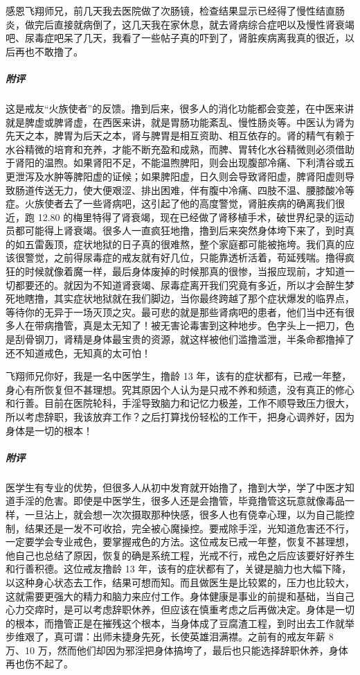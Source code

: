 \begin{case}
    感恩飞翔师兄，前几天我去医院做了次肠镜，检查结果显示已经得了慢性结直肠炎，做完后直接就病倒了，这几天我在家休息，就去肾病综合症吧以及慢性肾衰竭吧、尿毒症吧呆了几天，我看了一些帖子真的吓到了，肾脏疾病离我真的很近，以后再也不敢撸了。
    \subparagraph{附评} 这是戒友“火族使者”的反馈。撸到后来，很多人的消化功能都会变差，在中医来讲就是脾虚或脾肾虚，在西医来讲，就是胃肠功能紊乱、慢性肠炎等。中医认为肾为先天之本，脾胃为后天之本，肾与脾胃是相互资助、相互依存的。肾的精气有赖于水谷精微的培育和充养，才能不断充盈和成熟，而脾、胃转化水谷精微则必须借助于肾阳的温煦。如果肾阳不足，不能温煦脾阳，则会出现腹部冷痛、下利清谷或五更泄泻及水肿等脾阳虚的证候；如果脾阳虚，日久则会导致肾阳虚，脾肾阳虚则导致肠道传送无力，使大便艰涩、排出困难，伴有腹中冷痛、四肢不温、腰膝酸冷等症。火族使者去了一些肾病吧，这引起了他的高度警觉，肾脏疾病的确离我们很近，跑 12.80 的梅里特得了肾衰竭，现在已经做了肾移植手术，破世界纪录的运动员都可能得上肾衰竭。很多人一直疯狂地撸，撸到后来突然身体垮下来了，到时真的如五雷轰顶，症状地狱的日子真的很难熬，整个家庭都可能被拖垮。我们真的应该很警觉，之前得尿毒症的戒友就有好几位，只能靠透析活着，苟延残喘。撸得疯狂的时候就像着魔一样，最后身体废掉的时候那真的很惨，当报应现前，才知道一切都要还的。就因为不知道肾衰竭、尿毒症离开我们究竟有多近，所以才会醉生梦死地瞎撸，其实症状地狱就在我们脚边，当你最终跨越了那个症状爆发的临界点，等待你的无异于一场灭顶之灾。最可悲的就是那些肾病吧的患者，他们当中还有很多人在带病撸管，真是太无知了！被无害论毒害到这种地步。色字头上一把刀，色是刮骨钢刀，肾精是身体最宝贵的资源，就这样被他们滥撸滥泄，半条命都撸掉了还不知道戒色，无知真的太可怕！
\end{case}

\begin{case}
    飞翔师兄你好，我是一名中医学生，撸龄 13 年，该有的症状都有，已戒一年整，身心有所恢复但不甚理想。究其原因个人认为是只戒不养和频遗，没有真正的修心和行善。目前在医院轮科，手淫导致脑力和记忆力极差，工作不顺导致压力很大，所以考虑辞职，我该放弃工作？之后打算找份轻松的工作干，把身心调养好，因为身体是一切的根本！
    \subparagraph{附评} 医学生有专业的优势，但很多人从初中发育就开始撸了，撸到大学，学了中医才知道手淫的危害。即使是中医学生，很多人还是会撸管，毕竟撸管这玩意就像毒品一样，一旦沾上，就会想一次次摄取那种快感，很多人也有侥幸心理，以为自己能控制，结果还是一发不可收拾，完全被心魔操控。要戒除手淫，光知道危害还不行，一定要学会专业戒色，要掌握戒色的方法。这位戒友已戒一年整，恢复不甚理想，他自己也总结了原因，恢复的确是系统工程，光戒不行，戒色之后应该要好好养生和行善积德。这位戒友撸龄 13 年，该有的症状都有了，关键是脑力也大幅下降，以这种身心状态去工作，结果可想而知。而且做医生是比较累的，压力也比较大，这就需要更强大的精力和脑力来应付工作。身体健康是事业的前提和基础，当自己心力交瘁时，是可以考虑辞职休养，但应该在慎重考虑之后再做决定。身体是一切的根本，而撸管正是在摧残这个根本，当身体成了豆腐渣工程，到时出去工作就举步维艰了，真可谓：出师未捷身先死，长使英雄泪满襟。之前有的戒友年薪 8 万、10 万，然而他们却因为邪淫把身体搞垮了，最后也只能选择辞职休养，身体再也伤不起了。
\end{case}

